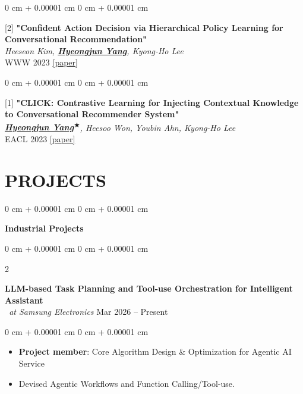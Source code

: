 \documentclass[10pt, letterpaper]{article}
\newenvironment{highlights}{
	\begin{itemize}[
		topsep=0.10 cm,
		parsep=0.10 cm,
		partopsep=0pt,
		itemsep=0pt,
		leftmargin=0 cm + 10pt
		]
	}{
	\end{itemize}
} %
\newenvironment{onecolentry}{
	\begin{adjustwidth}{
			0 cm + 0.00001 cm
		}{
			0 cm + 0.00001 cm
		}
	}{
	\end{adjustwidth}
} %
\newenvironment{twocolentry}[2][]{
	\onecolentry
	\def\secondColumn{#2}
	\setcolumnwidth{\fill, 4.5 cm}
	\begin{paracol}{2}
	}{
		\switchcolumn \raggedleft \secondColumn
	\end{paracol}
	\endonecolentry
} %
\begin{document}
\begin{samepage}
		\vspace{0.20 cm}
		\begin{onecolentry}
			[2] \textbf{"Confident Action Decision via Hierarchical Policy Learning for Conversational Recommendation"}\\
			\textit{Heeseon Kim, \textbf{\underline{Hyeongjun Yang}}, Kyong-Ho Lee}\\
			\vspace{0.05 cm}
			WWW 2023 \href{https://dl.acm.org/doi/abs/10.1145/3543507.3583536}{[paper]}
		\end{onecolentry}
		
		\vspace{0.20 cm}
		\begin{onecolentry}
			[1] \textbf{"CLICK: Contrastive Learning for Injecting Contextual Knowledge to Conversational Recommender System"}\\
			\textit{\textbf{\underline{Hyeongjun Yang\textsuperscript{$\bigstar$}}}, Heesoo Won, Youbin Ahn, Kyong-Ho Lee}\\
			\vspace{0.05 cm}
			EACL 2023 \href{https://aclanthology.org/2023.eacl-main.137/}{[paper]}
		\end{onecolentry}

\vspace{0.2 cm}	
		

	\end{samepage}

	
	
	\section{PROJECTS}
	\begin{onecolentry}
		\textbf{\large \faBuilding \hspace{0.1cm} Industrial Projects}
	\end{onecolentry}
	\vspace{0.15 cm}
	
	\begin{twocolentry}{
			Mar 2026 – Present
		}
		\textbf{LLM-based Task Planning and Tool-use Orchestration for Intelligent Assistant}\\ 
		\textit{\ at Samsung Electronics }\end{twocolentry}
	\begin{onecolentry}
		\begin{highlights}
			\item \textbf{Project member}: Core Algorithm Design \& Optimization for Agentic AI Service
			\item Devised Agentic Workflows and Function Calling/Tool-use.
		\end{highlights}
	\end{onecolentry}
	
\end{document}
